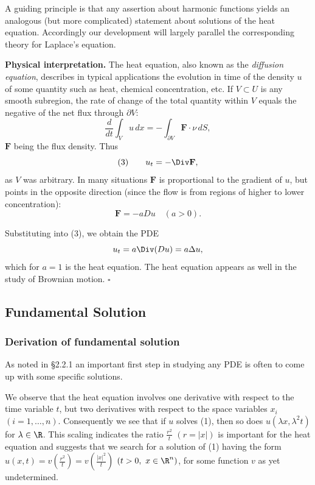 A guiding principle is that any assertion about harmonic functions yields an analogous (but more complicated) statement about solutions of the heat equation. Accordingly our development will largely parallel the corresponding theory for Laplace's equation.

\textbf{Physical interpretation.} The heat equation, also known as the \textit{diffusion equation}, describes in typical applications the evolution in time of the density $u$ of some quantity such as heat, chemical concentration, etc. If $V \subset U$ is any smooth subregion, the rate of change of the total quantity within $V$ equals the negative of the net flux through $\partial V$:
$$\frac{d}{dt} \int_V u \, dx = -\int_{\partial V} \mathbf{F} \cdot \nu \, dS,$$
$\mathbf{F}$ being the flux density. Thus
$$(3) \qquad u_t = -\Div \mathbf{F},$$
as $V$ was arbitrary. In many situations $\mathbf{F}$ is proportional to the gradient of $u$, but points in the opposite direction (since the flow is from regions of higher to lower concentration):
$$\mathbf{F} = -a Du \quad (a > 0).$$

Substituting into (3), we obtain the PDE
$$u_t = a \Div(Du) = a \Delta u,$$
which for $a = 1$ is the heat equation. The heat equation appears as well in the study of Brownian motion. $\square$

\subsection{Fundamental Solution}
\label{sec:heat-fundamental-solution}

\subsubsection{Derivation of fundamental solution}
\label{sec:heat-fundamental-solution-derivation}

As noted in \S2.2.1 an important first step in studying any PDE is often to come up with some specific solutions.

We observe that the heat equation involves one derivative with respect to the time variable $t$, but two derivatives with respect to the space variables $x_i$ $(i=1,\ldots,n)$. Consequently we see that if $u$ solves (1), then so does $u(\lambda x,\lambda^2 t)$ for $\lambda \in \R$. This scaling indicates the ratio $\frac{r^2}{t}$ $(r = |x|)$ is important for the heat equation and suggests that we search for a solution of (1) having the form $u(x,t) = v(\frac{r^2}{t}) = v(\frac{|x|^2}{t})$ $(t>0,\ x \in \R^n)$, for some function $v$ as yet undetermined.

